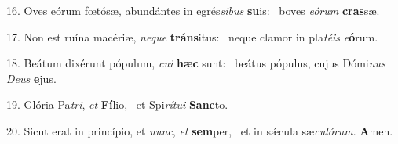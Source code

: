 16. Oves eórum fœtósæ, abundántes in egrés\textit{si}\textit{bus} \textbf{su}is: \ast\  boves \textit{e}\textit{ó}\textit{rum} \textbf{cras}sæ.\

17. Non est ruína macériæ, \textit{ne}\textit{que} \textbf{tráns}itus: \ast\  neque clamor in pla\textit{té}\textit{is} \textit{e}\textbf{ó}rum.\

18. Beátum dixérunt pópulum, \textit{cu}\textit{i} \textbf{hæc} sunt: \ast\  beátus pópulus, cujus Dómi\textit{nus} \textit{De}\textit{us} \textbf{e}jus.\

19. Glória Pa\textit{tri}, \textit{et} \textbf{Fí}lio, \ast\  et Spi\textit{rí}\textit{tu}\textit{i} \textbf{Sanc}to.\

20. Sicut erat in princípio, et \textit{nunc}, \textit{et} \textbf{sem}per, \ast\  et in sǽcula sæ\textit{cu}\textit{ló}\textit{rum}. \textbf{A}men.\

